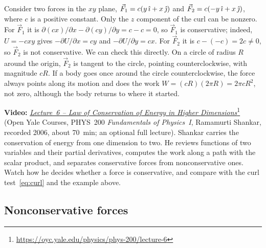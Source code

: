 \documentclass[11pt,a4paper]{article}
\begin{document}
\begin{example}
\setlength{\parskip}{0.5em plus 0.1em}%
Consider two forces in the $xy$ plane, $\vec{F}_1 = c(y\,\hat{\imath} + x\,\hat{\jmath})$ and
$\vec{F}_2 = c(-y\,\hat{\imath} + x\,\hat{\jmath})$, where $c$ is a positive constant. Only the $z$ component of
the curl can be nonzero. For $\vec{F}_1$ it is $\partial(cx)/\partial x - \partial(cy)/\partial y =
c - c = 0$, so $\vec{F}_1$ is conservative; indeed, $U = -cxy$ gives $-\partial U/\partial x = cy$ and
$-\partial U/\partial y = cx$. For $\vec{F}_2$ it is $c - (-c) = 2c \neq 0$, so $\vec{F}_2$ is not
conservative. We can check this directly. On a circle of radius $R$ around the origin,
$\vec{F}_2$ is tangent to the circle, pointing counterclockwise, with magnitude $cR$. If a body goes
once around the circle counterclockwise, the force always points along its motion and does the work
$W = (cR)(2\pi R) = 2\pi cR^2$, not zero, although the body returns to where it started.
\end{example}

\begin{aside}
\textbf{Video:}
\href{https://oyc.yale.edu/physics/phys-200/lecture-6}{\emph{Lecture~6 -- Law of Conservation of
Energy in Higher Dimensions}}\footnote{\url{https://oyc.yale.edu/physics/phys-200/lecture-6}} (Open
Yale Courses, PHYS~200 \emph{Fundamentals of Physics~I}, Ramamurti Shankar, recorded 2006, about
70~min; an optional full lecture). Shankar carries the conservation of energy from one dimension to
two. He reviews functions of two variables and their partial derivatives, computes the work along a
path with the scalar product, and separates conservative forces from nonconservative ones. Watch
how he decides whether a force is conservative, and compare with the curl
test~\eqref{eq:curl} and the example above.
\end{aside}

\subsection{Nonconservative forces}\label{sec:nonconservative}
\end{document}
